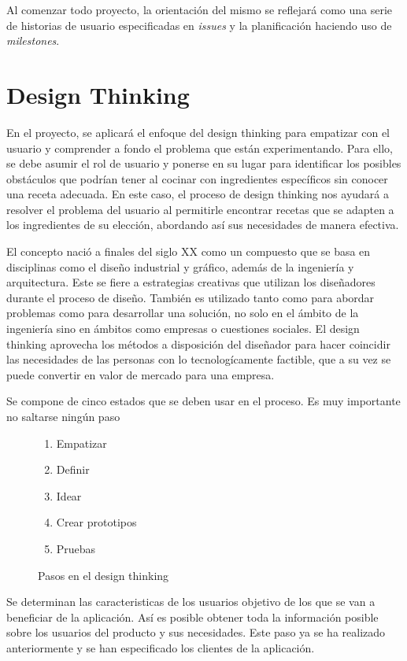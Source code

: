 Al comenzar todo proyecto, la orientación del mismo se reflejará como una serie de historias de usuario especificadas en \emph{issues} y la planificación haciendo uso de \emph{milestones}.

\section{Design Thinking}
En el proyecto, se aplicará el enfoque del \gls{design thinking} para empatizar con el usuario y comprender a fondo el problema que están experimentando. Para ello, se debe asumir el rol de usuario y ponerse en su lugar para identificar los posibles obstáculos que podrían tener al cocinar con ingredientes específicos sin conocer una receta adecuada. En este caso, el proceso de \gls{design thinking} nos ayudará a resolver el problema del usuario al permitirle encontrar recetas que se adapten a los ingredientes de su elección, abordando así sus necesidades de manera efectiva.

El concepto nació a finales del siglo XX como un compuesto que se basa en disciplinas como el diseño industrial y gráfico, además de la ingeniería y arquitectura. Este se fiere a estrategias creativas que utilizan los diseñadores durante el proceso de diseño. También es utilizado tanto como para abordar problemas como para desarrollar una solución, no solo en el ámbito de la ingeniería sino en ámbitos como empresas o cuestiones sociales. El \gls{design thinking} aprovecha los métodos a disposición del diseñador para hacer coincidir las necesidades de las personas con lo tecnologícamente factible, que a su vez se puede convertir en valor de mercado para una empresa.

Se compone de cinco estados que se deben usar en el proceso. Es muy importante no saltarse ningún paso
\begin{figure}[h]
    \begin{enumerate}
        \item Empatizar
        \item Definir
        \item Idear
        \item Crear prototipos
        \item Pruebas
    \end{enumerate}
    \caption{Pasos en el design thinking}
    \label{list:stepsDesign}
\end{figure}

Se determinan las caracteristicas de los usuarios objetivo de los que se van a beneficiar de la aplicación. Así es posible obtener toda la información posible sobre los usuarios del producto y sus necesidades. Este paso ya se ha realizado anteriormente y se han especificado los clientes de la aplicación.

